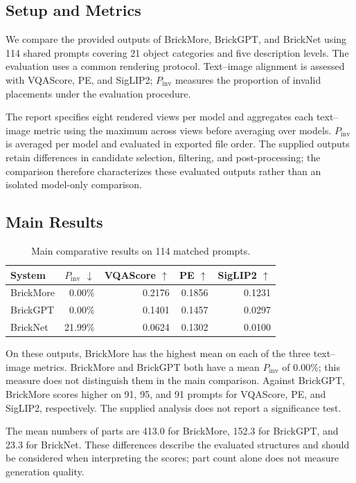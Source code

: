 \documentclass[10pt,twocolumn,letterpaper]{article}
\begin{document}
\subsection{Setup and Metrics}
We compare the provided outputs of BrickMore, BrickGPT, and BrickNet using 114 shared prompts covering 21 object categories and five description levels. The evaluation uses a common rendering protocol. Text--image alignment is assessed with VQAScore, PE, and SigLIP2; $P_{\mathrm{inv}}$ measures the proportion of invalid placements under the evaluation procedure.

The report specifies eight rendered views per model and aggregates each text--image metric using the maximum across views before averaging over models. $P_{\mathrm{inv}}$ is averaged per model and evaluated in exported file order. The supplied outputs retain differences in candidate selection, filtering, and post-processing; the comparison therefore characterizes these evaluated outputs rather than an isolated model-only comparison.

\subsection{Main Results}
\begin{table}[t]\centering\small\begin{tabular}{lrrrr}\toprule
System & $P_{\mathrm{inv}}$ $\downarrow$ & VQAScore $\uparrow$ & PE $\uparrow$ & SigLIP2 $\uparrow$ \\ \midrule
BrickMore & 0.00\% & 0.2176 & 0.1856 & 0.1231 \\
BrickGPT & 0.00\% & 0.1401 & 0.1457 & 0.0297 \\
BrickNet & 21.99\% & 0.0624 & 0.1302 & 0.0100 \\
\bottomrule\end{tabular}\caption{Main comparative results on 114 matched prompts.}\end{table}
On these outputs, BrickMore has the highest mean on each of the three text--image metrics. BrickMore and BrickGPT both have a mean $P_{\mathrm{inv}}$ of 0.00\%; this measure does not distinguish them in the main comparison. Against BrickGPT, BrickMore scores higher on 91, 95, and 91 prompts for VQAScore, PE, and SigLIP2, respectively. The supplied analysis does not report a significance test.

The mean numbers of parts are 413.0 for BrickMore, 152.3 for BrickGPT, and 23.3 for BrickNet. These differences describe the evaluated structures and should be considered when interpreting the scores; part count alone does not measure generation quality.
\end{document}
